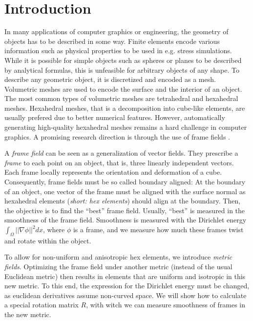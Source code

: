 \documentclass[../thesis.tex]{subfiles}
\begin{document}
\chapter{Introduction}
\label{ch:intro}
In many applications of computer graphics or engineering, the geometry of objects
has to be described in some way. Finite elements encode various information such as physical properties
to be used in e.g. stress simulations.
While it is possible for simple objects such as spheres or planes to be described by
analytical formulas, this is unfeasible for arbitrary objects of any shape.
To describe any geometric object, it is discretized and encoded as a mesh.
Volumetric meshes are used to encode the surface and the interior of an object.
The most common types of volumetric meshes are tetrahedral and hexahedral meshes.
Hexahedral meshes, that is a decomposition into cube-like elements,
are usually prefered due to better numerical features.
However, automatically generating high-quality hexahedral meshes remains a hard challenge
in computer graphics.
A promising research direction is through the use of frame fields \cite{Hex22}.

A \emph{frame field} can be seen as a generalization of vector fields.
They prescribe a \emph{frame} to each point on an object, that is, three linearly independent
vectors. Each frame locally represents the orientation and deformation of a cube.
Consequently, frame fields must be so called boundary aligned:
At the boundary of an object, one vector of the frame must be aligned with the surface normal
as hexahedral elements (\emph{short: hex elements}) should align at the boundary.
Then, the objective is to find the ``best'' frame field.
Usually, ``best'' is measured in the smoothness of the frame field.
Smoothness is measured with the Dirichlet energy $\int_{\Omega}||\nabla \phi||^2dx$,
where $\phi$ is a frame, and we measure how much these frames twist and rotate within the object.

To allow for non-uniform and anisotropic hex elements, we introduce
\emph{metric fields}. Optimizing the frame field under another metric (instead of the usual Euclidean metric) then results
in elements that are uniform and isotropic in this new metric.
To this end, the expression for the Dirichlet energy must be changed, as euclidean derivatives
assume non-curved space.
We will show how to calculate a special rotation matrix $R$, with witch we can measure
smoothness of frames in the new metric.
\end{document}
